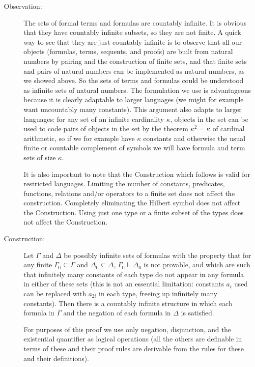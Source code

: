 \documentclass[12pt]{book}
\begin{document}
\begin{description}

\item[Observation:] The sets of formal terms and formulas are
countably infinite.  It is obvious that they have countably infinite
subsets, so they are not finite.  A quick way to see that they are
just countably infinite is to observe that all our objects (formulas,
terms, sequents, and proofs) are built from natural numbers by pairing
and the construction of finite sets, and that finite sets and pairs of
natural numbers can be implemented as natural numbers, as we showed
above.  So the sets of terms and formulas could be understood as
infinite sets of natural numbers.  The formulation we use is
advantageous because it is clearly adaptable to larger languages (we
might for example want uncountably many constants).  This argument
also adapts to larger languages: for any set of an infinite
cardinality $\kappa$, objects in the set can be used to code pairs of
objects in the set by the theorem $\kappa^2 = \kappa$ of cardinal
arithmetic, so if we for example have $\kappa$ constants and otherwise
the usual finite or countable complement of symbols we will have
formula and term sets of size $\kappa$.

It is also important to note that the Construction which follows is
valid for restricted languages.  Limiting the number of constants,
predicates, functions, relations and/or operators to a finite set does
not affect the construction.  Completely eliminating the Hilbert
symbol does not affect the Construction.  Using just one type or a
finite subset of the types does not affect the Construction.

\item[Construction:] Let $\Gamma$ and $\Delta$ be possibly infinite
sets of formulas with the property that for any finite $\Gamma_0
\subseteq \Gamma$ and $\Delta_0 \subseteq \Delta$, $\Gamma_0 \vdash
\Delta_0$ is not provable, and which are such that infinitely many
constants of each type do not appear in any formula in either of these
sets (this is not an essential limitation: constants $a_i$ used can be
replaced with $a_{2i}$ in each type, freeing up infinitely many
constants). Then there is a countably infinite structure in which each
formula in $\Gamma$ and the negation of each formula in $\Delta$ is
satisfied.

For purposes of this proof we use only negation, disjunction, and the
existential quantifier as logical operations (all the others are
definable in terms of these and their proof rules are derivable from
the rules for these and their definitions).


\end{description}
\end{document}
